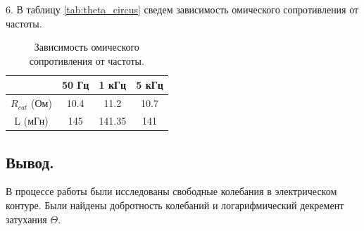 \documentclass[a4paper,12pt]{article} %
\begin{document}
6. В таблицу \eqref{tab:theta_circus} сведем зависимость омического сопротивления от частоты.

\begin{table}[H]
\caption{\label{tab:theta_circus} Зависимость омического сопротивления от частоты.}
\begin{center}
\begin{tabular}{|c|c|c|c|}
\hline
& 50 Гц & 1 кГц & 5 кГц\\
\hline
$R_{cat}$ (Ом) & 10.4 & 11.2 & 10.7\\
\hline
L (мГн) & 145 & 141.35 & 141\\
\hline
\end{tabular}
\end{center}
\label{table5:ref}
\end{table}

\begin{center}
	\section{Вывод.}
\end{center}

В процессе работы были исследованы свободные колебания в электрическом контуре. Были найдены добротность колебаний и логарифмический декремент затухания $\Theta$.
\end{document}

